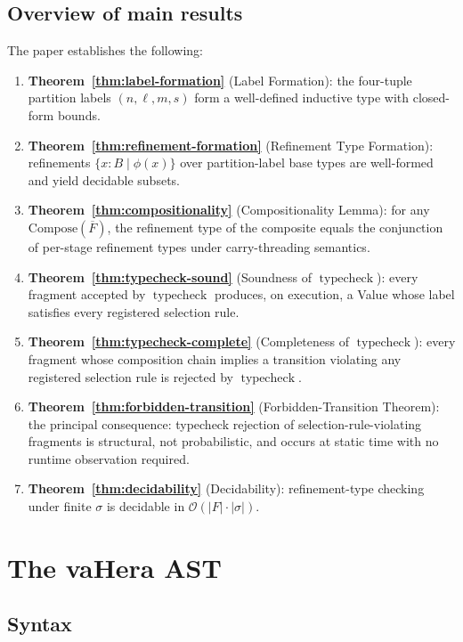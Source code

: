 \documentclass[twocolumn,11pt,a4paper]{article}
\DeclareMathOperator{\typecheck}{typecheck}
\newcommand{\Sel}{\sigma}
\newcommand{\Frag}{F}
\newcommand{\vComp}[1]{\mathrm{Compose}(#1)}
\begin{document}
\subsection{Overview of main results}

The paper establishes the following:
\begin{enumerate}[nosep,leftmargin=*]
\item \textbf{Theorem~\ref{thm:label-formation}} (Label Formation): the four-tuple partition labels $(n, \ell, m, s)$ form a well-defined inductive type with closed-form bounds.
\item \textbf{Theorem~\ref{thm:refinement-formation}} (Refinement Type Formation): refinements $\{x : B \mid \phi(x)\}$ over partition-label base types are well-formed and yield decidable subsets.
\item \textbf{Theorem~\ref{thm:compositionality}} (Compositionality Lemma): for any $\vComp{\overline{\Frag}}$, the refinement type of the composite equals the conjunction of per-stage refinement types under carry-threading semantics.
\item \textbf{Theorem~\ref{thm:typecheck-sound}} (Soundness of $\typecheck$): every fragment accepted by $\typecheck$ produces, on execution, a Value whose label satisfies every registered selection rule.
\item \textbf{Theorem~\ref{thm:typecheck-complete}} (Completeness of $\typecheck$): every fragment whose composition chain implies a transition violating any registered selection rule is rejected by $\typecheck$.
\item \textbf{Theorem~\ref{thm:forbidden-transition}} (Forbidden-Transition Theorem): the principal consequence: typecheck rejection of selection-rule-violating fragments is structural, not probabilistic, and occurs at static time with no runtime observation required.
\item \textbf{Theorem~\ref{thm:decidability}} (Decidability): refinement-type checking under finite $\Sel$ is decidable in $\mathcal{O}(|\Frag| \cdot |\Sel|)$.
\end{enumerate}

\section{The vaHera AST}
\label{sec:vahera}

\subsection{Syntax}
\end{document}
